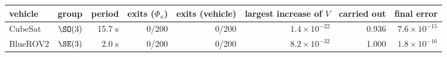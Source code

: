 \begin{tabular}{llrrrrrr}
\toprule
vehicle & group & period & exits ($\Phi_u$) & exits (vehicle) & largest increase of $V$ & carried out & final error \\
\midrule
CubeSat & $\SO(3)$ & 15.7 s & 0/200 & 0/200 & $1.4\times10^{-22}$ & 0.936 & $7.6\times10^{-15}$ \\
BlueROV2 & $\SE(3)$ & 2.0 s & 0/200 & 0/200 & $8.2\times10^{-32}$ & 1.000 & $1.8\times10^{-16}$ \\
\bottomrule
\end{tabular}